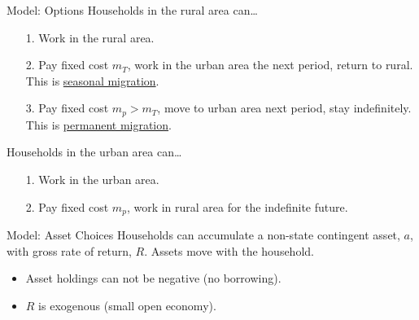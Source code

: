 \documentclass[9pt,pdftex,aspectratio=1610]{beamer}
\theoremstyle{definition}
\begin{document}

\begin{frame}[t]{Model: Options}
Households in the rural area can\ldots
\begin{itemize}
\smallskip
\item[1.] Work in the rural area.
\smallskip
\item[2.] Pay fixed cost $m_T$, work in the urban area the next period, return to rural.\\ \smallskip This is \underline{seasonal migration}.
\smallskip
\item[3.] Pay fixed cost $m_p > m_T$, move to urban area next period, stay indefinitely.\\ \smallskip This is \underline{permanent migration}.
\end{itemize}
\bigskip
Households in the urban area can\ldots
\begin{itemize}
\smallskip
\item[1.]  Work in the urban area.
\smallskip
\item[2.]  Pay fixed cost $m_p$, work in rural area for the indefinite future.
\end{itemize}
\end{frame}


\begin{frame}[t]{Model: Asset Choices}
Households can accumulate a non-state contingent asset, $a$, with gross rate of return, $R$. Assets move with the household.
\begin{itemize}
\smallskip
\item Asset holdings can not be negative (no borrowing).
\smallskip
\item $R$ is exogenous (small open economy).
\end{itemize}
\end{frame}

\end{document}
